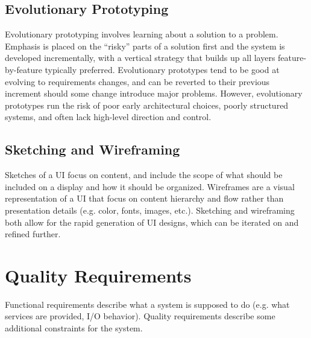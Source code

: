 \documentclass[12pt,titlepage]{article}
\begin{document}
      \subsection{Evolutionary Prototyping}
        Evolutionary prototyping involves learning about a solution to a problem. Emphasis is placed on the ``risky'' parts of a solution first and the system is developed incrementally,
        with a vertical strategy that builds up all layers feature-by-feature typically preferred. Evolutionary prototypes tend to be good at evolving to requirements changes, and can be
        reverted to their previous increment should some change introduce major problems. However, evolutionary prototypes run the risk of poor early architectural choices, poorly
        structured systems, and often lack high-level direction and control.

      \subsection{Sketching and Wireframing}
        Sketches of a UI focus on content, and include the scope of what should be included on a display and how it should be organized. Wireframes are a visual representation of a UI
        that focus on content hierarchy and flow rather than presentation details (e.g. color, fonts, images, etc.). Sketching and wireframing both allow for the rapid generation of
        UI designs, which can be iterated on and refined further.

  \newpage

  \section{Quality Requirements}
    Functional requirements describe what a system is supposed to do (e.g. what services are provided, I/O behavior). Quality requirements describe some
    additional constraints for the system.
\end{document}
